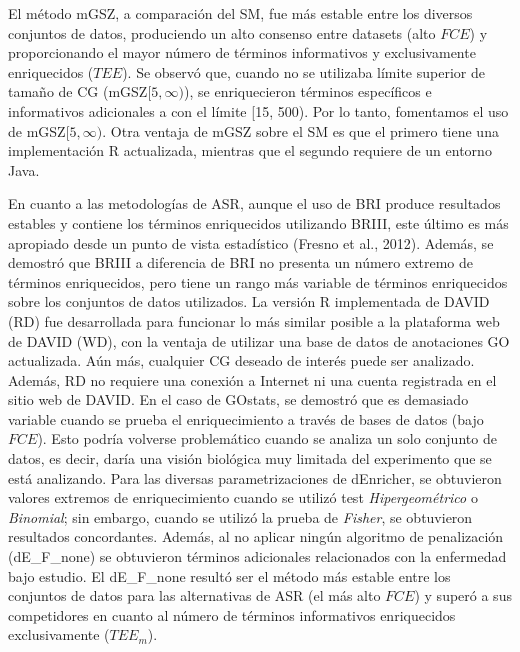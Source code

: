 \documentclass[12pt,twoside]{reedthesis}
\begin{document}
\par

El método mGSZ, a comparación del SM, fue más estable entre los diversos conjuntos de datos, produciendo un alto consenso entre datasets (alto \(FCE\)) y proporcionando el mayor número de términos informativos y exclusivamente enriquecidos (\(TEE\)). Se observó que, cuando no se utilizaba límite superior de tamaño de CG (mGSZ\([5,\infty)\)), se enriquecieron términos específicos e informativos adicionales a con el límite {[}15, 500). Por lo tanto, fomentamos el uso de mGSZ\([5,\infty)\). Otra ventaja de mGSZ sobre el SM es que el primero tiene una implementación R actualizada, mientras que el segundo requiere de un entorno Java.

\par

En cuanto a las metodologías de ASR, aunque el uso de BRI produce resultados estables y contiene los términos enriquecidos utilizando BRIII, este último es más apropiado desde un punto de vista estadístico (Fresno et al., 2012). Además, se demostró que BRIII a diferencia de BRI no presenta un número extremo de términos enriquecidos, pero tiene un rango más variable de términos enriquecidos sobre los conjuntos de datos utilizados. La versión R implementada de DAVID (RD) fue desarrollada para funcionar lo más similar posible a la plataforma web de DAVID (WD), con la ventaja de utilizar una base de datos de anotaciones GO actualizada. Aún más, cualquier CG deseado de interés puede ser analizado. Además, RD no requiere una conexión a Internet ni una cuenta registrada en el sitio web de DAVID. En el caso de GOstats, se demostró que es demasiado variable cuando se prueba el enriquecimiento a través de bases de datos (bajo \(FCE\)). Esto podría volverse problemático cuando se analiza un solo conjunto de datos, es decir, daría una visión biológica muy limitada del experimento que se está analizando. Para las diversas parametrizaciones de dEnricher, se obtuvieron valores extremos de enriquecimiento cuando se utilizó test \emph{Hipergeométrico} o \emph{Binomial}; sin embargo, cuando se utilizó la prueba de \emph{Fisher}, se obtuvieron resultados concordantes. Además, al no aplicar ningún algoritmo de penalización (dE\_F\_none) se obtuvieron términos adicionales relacionados con la enfermedad bajo estudio. El dE\_F\_none resultó ser el método más estable entre los conjuntos de datos para las alternativas de ASR (el más alto \(FCE\)) y superó a sus competidores en cuanto al número de términos informativos enriquecidos exclusivamente (\(TEE_m\)).
\end{document}
